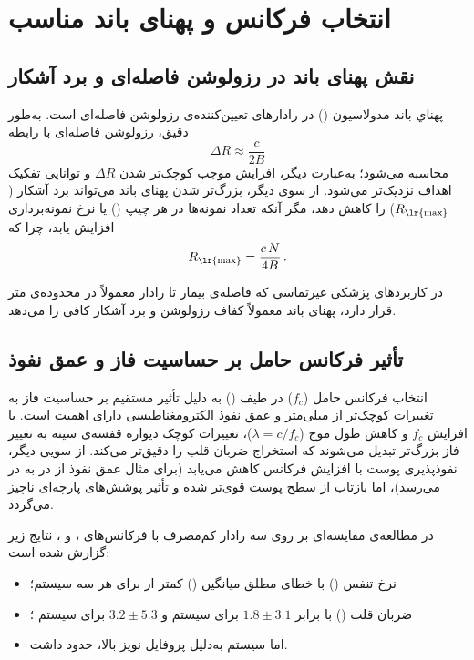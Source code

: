 \section{انتخاب فرکانس و پهنای باند مناسب}
\label{sec:frequency-band-selection}

\subsection{نقش پهنای باند در رزولوشن فاصله‌ای و برد آشکار}
پهناي باند مدولاسیون () در رادارهای  تعیین‌کننده‌ی رزولوشن فاصله‌ای است. به‌طور دقیق، رزولوشن فاصله‌ای با رابطه
\begin{equation}
\Delta R \approx \frac{c}{2B}
\end{equation}
محاسبه می‌شود؛ به‌عبارت دیگر، افزایش  موجب کوچک‌تر شدن $\Delta R$ و توانایی تفکیک اهداف نزدیک‌تر می‌شود.\cite{marty2024frequency} از سوی دیگر، بزرگ‌تر شدن پهنای باند می‌تواند برد آشکار ($R_\text{\lr{max}}$) را کاهش دهد، مگر آنکه تعداد نمونه‌ها در هر چیپ () یا نرخ نمونه‌برداری افزایش یابد، چرا که
\begin{equation}
R_\text{\lr{max}} = \frac{c\,N}{4B}\,.
\end{equation}

در کاربردهای پزشکی غیرتماسی که فاصله‌ی بیمار تا رادار معمولاً در محدوده‌ی  متر قرار دارد، پهنای باند  معمولاً کفاف رزولوشن  و برد آشکار کافی را می‌دهد.\cite{paterniani2023radar}

\subsection{تأثیر فرکانس حامل بر حساسیت فاز و عمق نفوذ}
انتخاب فرکانس حامل ($f_c$) در طیف  () به دلیل تأثیر مستقیم بر حساسیت فاز به تغییرات  کوچک‌تر از میلی‌متر و عمق نفوذ الکترومغناطیسی دارای اهمیت است. با افزایش $f_c$ و کاهش طول موج ($\lambda = c/f_c$)، تغییرات کوچک دیواره قفسه‌ی سینه به تغییر فاز بزرگ‌تر تبدیل می‌شوند که استخراج ضربان قلب را دقیق‌تر می‌کند. از سویی دیگر، نفوذپذیری پوست با افزایش فرکانس کاهش می‌یابد (برای مثال عمق نفوذ از \lr{2.7 mm} در  به \lr{0.5 mm} در  می‌رسد)، اما بازتاب از سطح پوست قوی‌تر شده و تأثیر پوشش‌های پارچه‌ای ناچیز می‌گردد.
\cite{marty2024frequency}

در مطالعه‌ی مقایسه‌ای بر روی سه رادار کم‌مصرف  با فرکانس‌های ،  و ، نتایج زیر گزارش شده است:
\begin{itemize}
  \item نرخ تنفس () با خطای مطلق میانگین () کمتر از  برای هر سه سیستم؛
  \item ضربان قلب () با  برابر $1.8 \pm 3.1$  برای سیستم  و $3.2 \pm 5.3$  برای سیستم ؛
  \item اما سیستم  به‌دلیل پروفایل نویز بالا،  حدود  داشت.
\end{itemize}


